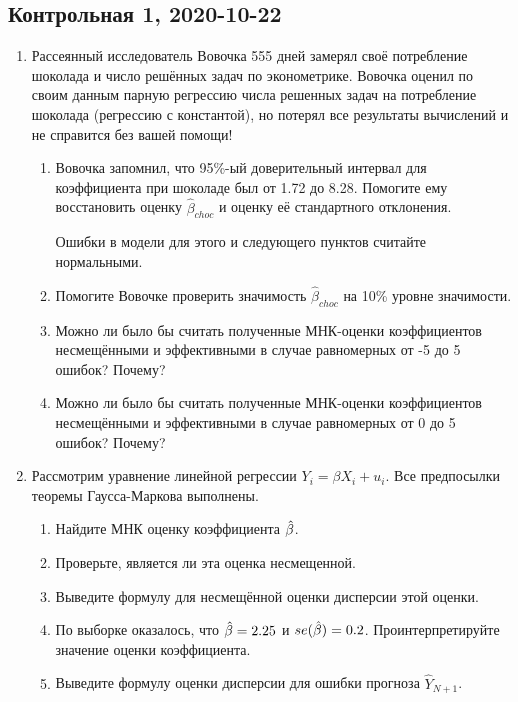
\subsection{Контрольная 1, 2020-10-22}


\begin{enumerate}


\item Рассеянный исследователь Вовочка 555 дней замерял своё потребление шоколада 
и число решённых задач по эконометрике. 
Вовочка оценил по своим данным парную регрессию числа решенных задач на потребление шоколада 
(регрессию с константой), но потерял все результаты вычислений и не справится без вашей помощи!

\begin{enumerate}
    \item Вовочка запомнил, что 95\%-ый доверительный интервал для коэффициента 
    при шоколаде был от 1.72 до 8.28. Помогите ему восстановить оценку $\hat\beta_{choc}$  и оценку её стандартного отклонения. 

    Ошибки в модели для этого и следующего пунктов считайте нормальными.
\item Помогите Вовочке проверить значимость  $\hat\beta_{choc}$ на 10\% уровне значимости.
\item Можно ли было бы считать полученные МНК-оценки коэффициентов несмещёнными и эффективными 
в случае равномерных от -5 до 5 ошибок? Почему?
\item Можно ли было бы считать полученные МНК-оценки коэффициентов несмещёнными и эффективными 
в случае равномерных от 0 до 5 ошибок? Почему?
\end{enumerate}


\item Рассмотрим уравнение линейной регрессии $Y_i = \beta X_i + u_i$. 
Все предпосылки теоремы Гаусса-Маркова выполнены.
\begin{enumerate}
\item Найдите МНК  оценку коэффициента $\hat{\beta}$.
\item Проверьте,  является  ли эта оценка несмещенной.
\item Выведите формулу для несмещённой оценки дисперсии этой оценки. 
\item По выборке оказалось, что $\hat{\beta} = 2.25$ и $se(\hat{\beta})=0.2$. 
Проинтерпретируйте значение оценки коэффициента.
\item Выведите формулу оценки дисперсии для ошибки прогноза $\hat Y_{N+1}$.
\end{enumerate}


\end{enumerate}
